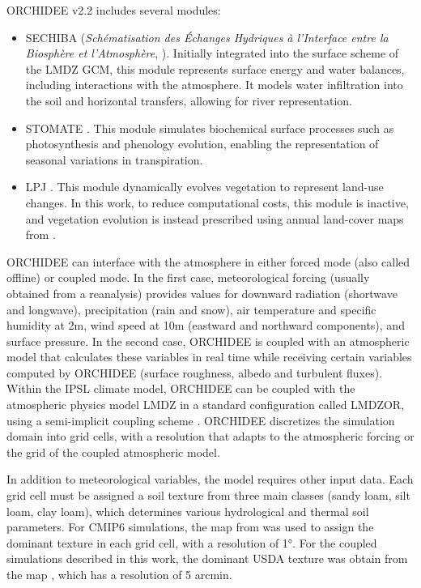 ORCHIDEE v2.2 includes several modules:
\begin{itemize}
    \item SECHIBA (\textit{Schématisation des Échanges Hydriques à l’Interface entre la Biosphère et l’Atmosphère}, \cite{ducoudre_sechiba_1993}). Initially integrated into the surface scheme of the LMDZ GCM, this module represents surface energy and water balances, including interactions with the atmosphere. It models water infiltration into the soil and horizontal transfers, allowing for river representation.
    \item STOMATE \citep{krinner_dynamic_2005}. This module simulates biochemical surface processes such as photosynthesis and phenology evolution, enabling the representation of seasonal variations in transpiration.
    \item LPJ \citep{sitch_evaluation_2003}. This module dynamically evolves vegetation to represent land-use changes. In this work, to reduce computational costs, this module is inactive, and vegetation evolution is instead prescribed using annual land-cover maps from \citet{belward1999igbp}.
\end{itemize}

ORCHIDEE can interface with the atmosphere in either forced mode (also called offline) or coupled mode. 
In the first case, meteorological forcing (usually obtained from a reanalysis) provides values for downward radiation (shortwave and longwave), precipitation (rain and snow), air temperature and specific humidity at 2m, wind speed at 10m (eastward and northward components), and surface pressure. 
In the second case, ORCHIDEE is coupled with an atmospheric model that calculates these variables in real time while receiving certain variables computed by ORCHIDEE (surface roughness, albedo and turbulent fluxes). 
Within the IPSL climate model, ORCHIDEE can be coupled with the atmospheric physics model LMDZ in a standard configuration called LMDZOR, using a semi-implicit coupling scheme \citep{polcher_proposal_1998}. %
ORCHIDEE discretizes the simulation domain into grid cells, with a resolution that adapts to the atmospheric forcing or the grid of the coupled atmospheric model.

In addition to meteorological variables, the model requires other input data. Each grid cell must be assigned a soil texture from three main classes (sandy loam, silt loam, clay loam), which determines various hydrological and thermal soil parameters. 
For CMIP6 simulations, the map from \citet{zobler87802world} was used to assign the dominant  texture in each grid cell, with a resolution of 1°. For the coupled simulations described in this work, the dominant USDA texture was obtain from the map \citet{reynolds_estimating_2000}, which has a resolution of 5 arcmin.

